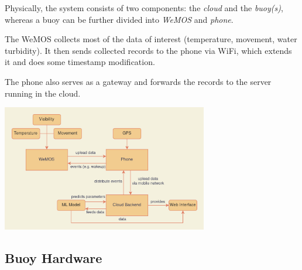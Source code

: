 \documentclass{article}
\begin{document}
\begin{multicols}{2}

Physically, the system consists of two components: the \textit{cloud} and the \textit{buoy(s)}, whereas a buoy can be further divided into \textit{WeMOS} and \textit{phone}. 

The WeMOS collects most of the data of interest (temperature, movement, water turbidity). It then sends collected records to the phone via WiFi, which extends it and does some timestamp modification.

The phone also serves as a gateway and forwards the records to the server running in the cloud.

\includegraphics[width=9cm]{report/resources/architecture.png}

\end{multicols}

\subsection{Buoy Hardware}
\end{document}
